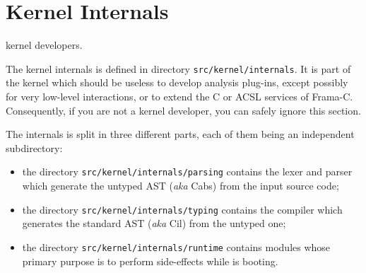 
\section{Kernel Internals}\label{archi:internals}

\begin{target}kernel developers.\end{target}

The kernel internals is defined in directory \texttt{src/kernel/internals}. It
is part of the \framac kernel which should be useless to develop analysis
plug-ins, except possibly for very low-level interactions, or to extend the
C or ACSL services of Frama-C. Consequently, if you are not a kernel
developer, you can safely ignore this section.

The internals is split in three different parts, each of them being an
independent subdirectory:
\begin{itemize}
\item the directory \texttt{src/kernel/internals/parsing} contains the lexer
  and parser which generate the untyped AST (\emph{aka} Cabs) from the \C input
  source code;
\item the directory \texttt{src/kernel/internals/typing} contains the
  compiler which generates the standard AST (\emph{aka} Cil) from the untyped
  one;
\item the directory \texttt{src/kernel/internals/runtime} contains modules
  whose primary purpose is to perform side-effects while \framac is booting.
\end{itemize}
